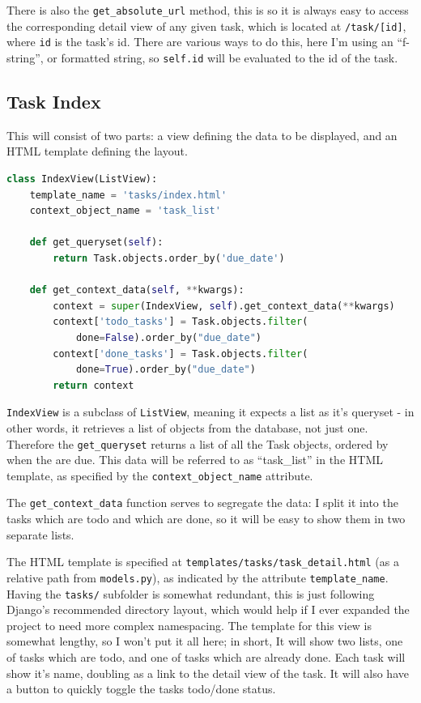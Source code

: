 \documentclass{article}
\begin{document}
There is also the \texttt{get\_absolute\_url} method,
this is so it is always easy to access the corresponding detail view of any given task,
which is located at \texttt{/task/[id]}, where \texttt{id} is the task's id.
There are various ways to do this,
here I'm using an ``f-string'',
or formatted string,
so \texttt{{self.id}} will be evaluated to the id of the task.

\subsection{Task Index}
This will consist of two parts:
a view defining the data to be displayed,
and an HTML template defining the layout.

\begin{lstlisting}[language=Python, breaklines]
class IndexView(ListView):
    template_name = 'tasks/index.html'
    context_object_name = 'task_list'

    def get_queryset(self):
        return Task.objects.order_by('due_date')

    def get_context_data(self, **kwargs):
        context = super(IndexView, self).get_context_data(**kwargs)
        context['todo_tasks'] = Task.objects.filter(
            done=False).order_by("due_date")
        context['done_tasks'] = Task.objects.filter(
            done=True).order_by("due_date")
        return context
\end{lstlisting}

\texttt{IndexView} is a subclass of \texttt{ListView},
meaning it expects a list as it's queryset -
in other words,
it retrieves a list of objects from the database,
not just one.
Therefore the \texttt{get\_queryset} returns a list of all the Task objects,
ordered by when the are due.
This data will be referred to as ``task\_list'' in the HTML template,
as specified by the \texttt{context\_object\_name} attribute.

The \texttt{get\_context\_data} function serves to segregate the data:
I split it into the tasks which are todo and which are done,
so it will be easy to show them in two separate lists.

The HTML template is specified at \texttt{templates/tasks/task\_detail.html}
(as a relative path from \texttt{models.py}),
as indicated by the attribute \texttt{template\_name}.
Having the \texttt{tasks/} subfolder is somewhat redundant,
this is just following Django's recommended directory layout,
which would help if I ever expanded the project to need more complex namespacing.
The template for this view is somewhat lengthy,
so I won't put it all here;
in short,
It will show two lists,
one of tasks which are todo,
and one of tasks which are already done.
Each task will show it's name,
doubling as a link to the detail view of the task.
It will also have a button to quickly toggle the tasks todo/done status.
\end{document}
